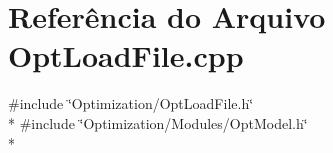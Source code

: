 \section{Referência do Arquivo Opt\+Load\+File.\+cpp}
\label{_opt_load_file_8cpp}
{\ttfamily \#include \char`\"{}Optimization/\+Opt\+Load\+File.\+h\char`\"{}}\\*
{\ttfamily \#include \char`\"{}Optimization/\+Modules/\+Opt\+Model.\+h\char`\"{}}\\*
